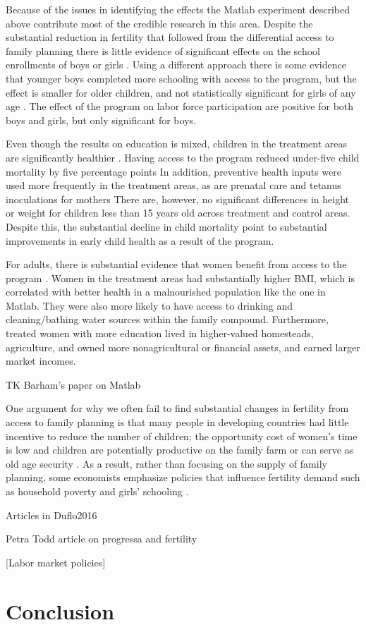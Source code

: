 \documentclass[letterpaper,12pt]{article}
\begin{document}
Because of the issues in identifying the effects the Matlab experiment
described above contribute most of the credible research in this area.
Despite the substantial reduction in fertility that followed from 
the differential access to family planning there is little evidence
of significant effects on the school enrollments of boys or 
girls \citep{Sinha2005}.
Using a different approach there is some evidence that younger boys 
completed more schooling with access to the program, but the effect 
is smaller for older children, and not statistically significant for 
girls of any age \citep{Joshi2007}.
The effect of the program on labor force participation are positive
for both boys and girls, but only signiﬁcant for boys.

Even though the results on education is mixed, children in the
treatment areas are significantly healthier \citep{Joshi2007}.
Having access to the program reduced under-five child mortality by five
percentage points
In addition, preventive health inputs were used more frequently in the
treatment areas, as are prenatal care and tetanus inoculations for mothers
There are, however, no significant differences in height or weight
for children less than 15 years old across treatment and control areas.
Despite this, the substantial decline in child mortality point to
substantial improvements in early child health as a result of the
program.

For adults, there is substantial evidence that women benefit from access 
to the program \citep{Joshi2007}.
Women in the treatment areas had substantially higher BMI, which
is correlated with better health in a malnourished population like
the one in Matlab.
They were also more likely to have access to drinking and 
cleaning/bathing water sources within the family compound.
Furthermore, treated women with more education lived in higher-valued 
homesteads, agriculture, and owned more nonagricultural or financial assets,
and earned larger market incomes.





TK Barham's paper on Matlab



One argument for why we often fail to find substantial changes in
fertility from access to family planning is that many people in 
developing countries had little incentive to reduce the number of children;
the opportunity cost of women's time is low and children are potentially 
productive on the family farm or can serve as old age security
\citep{Banerjee2014,Lambert2016}.
As a result, rather than focusing on the supply of family planning, 
some economists emphasize policies that influence fertility demand 
such as household poverty and girls' schooling 
\citep{pritchett94a,DasGupta2011}.




\citep{schultz02}

Articles in Duflo2016

\citet{Ainsworth1996}

Petra Todd article on progressa and fertility \citet{todd06}

[Labor market policies]


\section{Conclusion}




\end{document}
